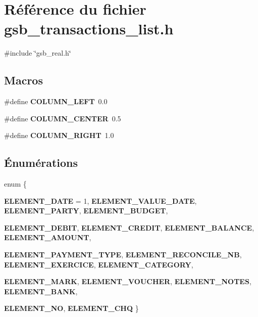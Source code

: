 \section{Référence du fichier gsb\_\-transactions\_\-list.h}
\label{gsb__transactions__list_8h}
{\ttfamily \#include \char`\"{}gsb\_\-real.h\char`\"{}}\par
\subsection*{Macros}
\begin{DoxyCompactItemize}
\item 
\#define {\bf COLUMN\_\-LEFT}~0.0
\item 
\#define {\bf COLUMN\_\-CENTER}~0.5
\item 
\#define {\bf COLUMN\_\-RIGHT}~1.0
\end{DoxyCompactItemize}
\subsection*{Énumérations}
\begin{DoxyCompactItemize}
\item 
enum \{ \par
{\bf ELEMENT\_\-DATE} =  1, 
{\bf ELEMENT\_\-VALUE\_\-DATE}, 
{\bf ELEMENT\_\-PARTY}, 
{\bf ELEMENT\_\-BUDGET}, 
\par
{\bf ELEMENT\_\-DEBIT}, 
{\bf ELEMENT\_\-CREDIT}, 
{\bf ELEMENT\_\-BALANCE}, 
{\bf ELEMENT\_\-AMOUNT}, 
\par
{\bf ELEMENT\_\-PAYMENT\_\-TYPE}, 
{\bf ELEMENT\_\-RECONCILE\_\-NB}, 
{\bf ELEMENT\_\-EXERCICE}, 
{\bf ELEMENT\_\-CATEGORY}, 
\par
{\bf ELEMENT\_\-MARK}, 
{\bf ELEMENT\_\-VOUCHER}, 
{\bf ELEMENT\_\-NOTES}, 
{\bf ELEMENT\_\-BANK}, 
\par
{\bf ELEMENT\_\-NO}, 
{\bf ELEMENT\_\-CHQ}
 \}
\end{DoxyCompactItemize}
